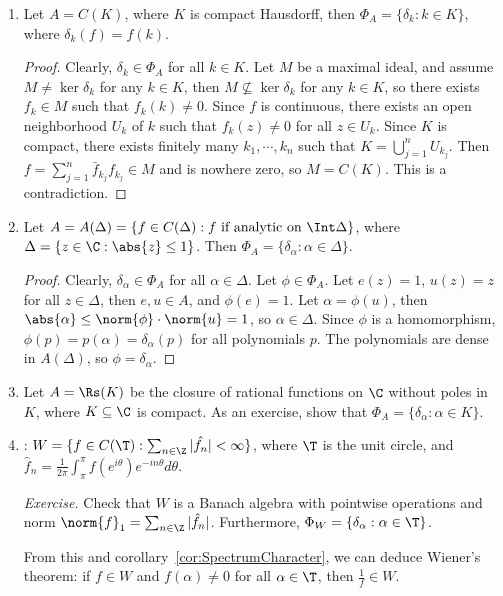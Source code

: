 \documentclass[a4paper]{article}
\begin{document}
\begin{eg}
	\begin{enumerate}[label=(\arabic*)]
		\item Let $A=C(K)$, where $K$ is compact Hausdorff, then $\Phi_A=\{\delta_k:k\in K\}$, where $\delta_k(f)=f(k)$.
		\vspace{-\topsep}
		\begin{proof}
		 Clearly, $\delta_k\in\Phi_A$ for all $k\in K$. Let $M$ be a maximal ideal, and assume $M\not=\ker\delta_k$ for any $k\in K$, then $M\not\subseteq\ker\delta_k$ for any $k\in K$, so there exists $f_k\in M$ such that $f_k(k)\not= 0$. Since $f$ is continuous, there exists an open neighborhood $U_k$ of $k$ such that $f_k(z)\not= 0$ for all $z\in U_k$. Since $K$ is compact, there exists finitely many $k_1,\cdots,k_n$ such that $K=\bigcup_{j=1}^n U_{k_j}$. Then $f=\sum_{j=1}^n\bar{f}_{k_j}f_{k_j}\in M$ and is nowhere zero, so $M=C(K)$. This is a contradiction.
		\end{proof}
		\item Let $A=A(\Delta)=\{f\in C(\Delta):f\text{ if analytic on }\Int\Delta\}$, where $\Delta=\{z\in\C:\abs{z}\leq 1\}$. Then $\Phi_A=\{\delta_\alpha:\alpha\in\Delta\}$.
		\vspace{-\topsep}
		\begin{proof}
		 Clearly, $\delta_\alpha\in\Phi_A$ for all $\alpha\in\Delta$. Let $\phi\in\Phi_A$. Let $e(z)=1$, $u(z)=z$ for all $z\in\Delta$, then $e,u\in A$, and $\phi(e)=1$. Let $\alpha=\phi(u)$, then $\abs{\alpha}\leq\norm{\phi}\cdot\norm{u}=1$, so $\alpha\in\Delta$. Since $\phi$ is a homomorphism, $\phi(p)=p(\alpha)=\delta_\alpha(p)$ for all polynomials $p$. The polynomials are dense in $A(\Delta)$, so $\phi=\delta_\alpha$.
		\end{proof}
		\item Let $A=\Rs(K)$ be the closure of rational functions on $\C$ without poles in $K$, where $K\subseteq\C$ is compact. As an exercise, show that $\Phi_A=\{\delta_\alpha:\alpha\in K\}$.
		\item {}: $W=\{f\in C(\T):\sum_{n\in\Z}|\hat{f_n}|<\infty\}$, where $\T$ is the unit circle, and $\hat{f}_n=\frac{1}{2\pi}\int_{\pi}^\pi f(e^{i\theta})e^{-in\theta}d\theta$.

		\emph{Exercise.} Check that $W$ is a Banach algebra with pointwise operations and norm $\norm{f}_1=\sum_{n\in\Z}|\hat{f}_n|$. Furthermore, $\Phi_W=\{\delta_\alpha:\alpha\in\T\}$.

		From this and corollary~\ref{cor:SpectrumCharacter}, we can deduce Wiener's theorem: if $f\in W$ and $f(\alpha)\not= 0$ for all $\alpha\in\T$, then $\frac{1}{f}\in W$.
	\end{enumerate}
\end{eg}
\end{document}
